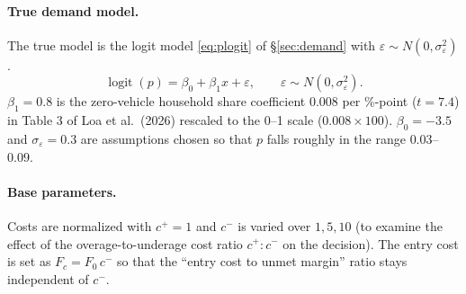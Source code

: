 \documentclass[10pt,a4paper]{article}
\DeclareMathOperator{\logit}{logit}
\begin{document}
\paragraph{True demand model.}

The true model is the logit model \eqref{eq:plogit} of \S\ref{sec:demand} with $\varepsilon\sim N(0,\sigma_\varepsilon^2)$.
\begin{equation}\label{eq:truth}
\logit(p)= \beta_0+\beta_1 x+\varepsilon,\qquad \varepsilon\sim N(0,\sigma_\varepsilon^2).
\end{equation}
$\beta_1=0.8$ is the zero-vehicle household share coefficient $0.008$ per \%-point ($t=7.4$) in Table 3 of Loa et al.\ (2026) rescaled to the 0--1 scale ($0.008\times100$). $\beta_0=-3.5$ and $\sigma_\varepsilon=0.3$ are assumptions chosen so that $p$ falls roughly in the range $0.03$--$0.09$.

\paragraph{Base parameters.}
Costs are normalized with $c^+=1$ and $c^-$ is varied over $1, 5, 10$ (to examine the effect of the overage-to-underage cost ratio $c^+:c^-$ on the decision). The entry cost is set as $F_c=F_0\,c^-$ so that the ``entry cost to unmet margin'' ratio stays independent of $c^-$.
\end{document}
